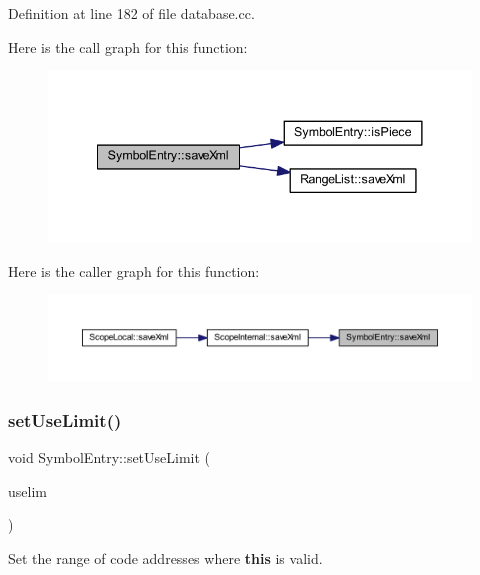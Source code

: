 Definition at line 182 of file database.\+cc.

Here is the call graph for this function\+:
\nopagebreak
\begin{figure}[H]
\begin{center}
\leavevmode
\includegraphics[width=341pt]{class_symbol_entry_a4d81d9bb16fee6c63a169680073dd28b_cgraph}
\end{center}
\end{figure}
Here is the caller graph for this function\+:
\nopagebreak
\begin{figure}[H]
\begin{center}
\leavevmode
\includegraphics[width=350pt]{class_symbol_entry_a4d81d9bb16fee6c63a169680073dd28b_icgraph}
\end{center}
\end{figure}
\mbox{\label{class_symbol_entry_a3ca8de2b7de4adcabc35899d23f9b2e1}} 
\subsubsection{\texorpdfstring{setUseLimit()}{setUseLimit()}}
{\footnotesize\ttfamily void Symbol\+Entry\+::set\+Use\+Limit (\begin{DoxyParamCaption}\item[{const \mbox{\hyperlink{class_range_list}{Range\+List}} \&}]{uselim }\end{DoxyParamCaption})\hspace{0.3cm}{\ttfamily [inline]}}



Set the range of code addresses where {\bfseries{this}} is valid. 




